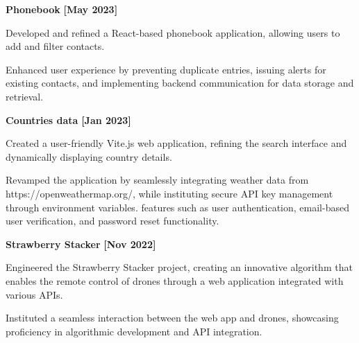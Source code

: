 \documentclass[a4paper,10pt]{article}
\begin{document}
\begin{itemize*}
  \setlength{\itemsep}{1pt}
  \item \textbf{\small{Phonebook}} \hfill {\small{{\textbf{[May 2023]}}}\/}
  \begin{itemize*}
    \item Developed and refined a React-based phonebook application, allowing users to add and filter contacts.
    \item Enhanced user experience by preventing duplicate entries, issuing alerts for existing contacts, and implementing backend communication for data storage and retrieval.
  \end{itemize*}
\end{itemize*}

\begin{itemize*}
  \setlength{\itemsep}{1pt}
  \item \textbf{\small{Countries data}} \hfill {\small{{\textbf{[Jan 2023]}}}\/}
  \begin{itemize*}
    \item Created a user-friendly Vite.js web application, refining the search interface and dynamically displaying country details.
  \end{itemize*}
  \begin{itemize*}
    \item Revamped the application by seamlessly integrating weather data from https://openweathermap.org/, while instituting secure API key management through environment variables.
    features such as user authentication, email-based user verification, and password reset functionality.
  \end{itemize*}
\end{itemize*}

\begin{itemize*}
  \setlength{\itemsep}{1pt}
  \item \textbf{\small{Strawberry Stacker}} \hfill {\small{{\textbf{[Nov 2022]}}}\/}
  \begin{itemize*}
    \item     Engineered the Strawberry Stacker project, creating an innovative algorithm that enables the remote control of drones through a web application integrated with various APIs.
    \item Instituted a seamless interaction between the web app and drones, showcasing proficiency in algorithmic development and API integration.
  \end{itemize*}
\end{itemize*}
\end{document}
